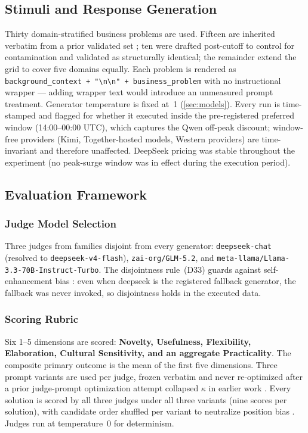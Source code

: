 \documentclass[12pt,a4paper]{article}
\begin{document}
\subsection{Stimuli and Response Generation}

Thirty domain-stratified business problems are used. Fifteen are inherited
verbatim from a prior validated set \citep{Hariri2025a}; ten were drafted
post-cutoff to control for contamination and validated as structurally identical;
the remainder extend the grid to cover five domains equally. Each problem is
rendered as \texttt{background\_context + "\textbackslash n\textbackslash n" +
business\_problem} with no instructional wrapper --- adding wrapper text would
introduce an unmeasured prompt treatment. Generator temperature is fixed at~1
(\cref{sec:models}). Every run is time-stamped and flagged for whether it
executed inside the pre-registered preferred window (14:00--00:00 UTC), which
captures the Qwen off-peak discount; window-free providers (Kimi, Together-hosted
models, Western providers) are time-invariant and therefore unaffected.
DeepSeek pricing was stable throughout the experiment (no peak-surge window was
in effect during the execution period).

\subsection{Evaluation Framework}\label{sec:eval}

\subsubsection{Judge Model Selection}

Three judges from families disjoint from every generator: \texttt{deepseek-chat}
(resolved to \texttt{deepseek-v4-flash}), \texttt{zai-org/GLM-5.2}, and
\texttt{meta-llama/Llama-3.3-70B-Instruct-Turbo}. The disjointness rule~(D33)
guards against self-enhancement bias \citep{ZhengEtAl2023}: even when deepseek
is the registered fallback generator, the fallback was never invoked, so
disjointness holds in the executed data.

\subsubsection{Scoring Rubric}

Six 1--5 dimensions are scored: \textbf{Novelty, Usefulness, Flexibility,
Elaboration, Cultural Sensitivity, and an aggregate Practicality}. The composite
primary outcome is the mean of the first five dimensions. Three prompt variants
are used per judge, frozen verbatim and never re-optimized after a prior
judge-prompt optimization attempt collapsed $\kappa$ in earlier work
\citep{Hariri2025a}. Every solution is scored by all three judges under all
three variants (nine scores per solution), with candidate order shuffled per
variant to neutralize position bias \citep{ZhengEtAl2023}. Judges run at
temperature~0 for determinism.
\end{document}

